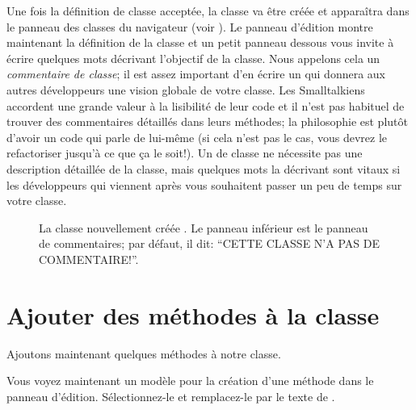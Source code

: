 \documentclass[a4paper,10pt,twoside]{book}
\begin{document}
Une fois la définition de classe acceptée, la classe va \^etre créée et
apparaîtra dans le panneau des classes du navigateur (voir ).
Le panneau d'édition montre maintenant la définition de la classe et
un petit panneau dessous vous invite à écrire quelques mots décrivant
l'objectif de la classe. Nous appelons cela un \emph{commentaire de
  classe}; il est assez important d'en écrire un qui donnera aux
autres développeurs une vision 
globale de votre classe.
Les Smalltalkiens accordent une grande valeur à la lisibilité de leur
code et il n'est pas habituel de trouver des commentaires détaillés
dans leurs méthodes; la philosophie est plutôt d'avoir un code qui
parle de lui-m\^eme (si cela n'est pas le cas, vous devrez le
refactoriser jusqu'à ce que \c{c}a le soit!). 
Un  de classe ne nécessite pas une
description détaillée de la classe, mais quelques mots la décrivant
sont vitaux si les développeurs qui viennent après vous souhaitent
passer un peu de temps sur votre classe.


\begin{figure}[h!t]
\caption{La classe nouvellement créée . Le panneau
  inférieur est le panneau de commentaires; par défaut, il dit:
  ``CETTE CLASSE N'A PAS DE COMMENTAIRE!''.
\label{fig:SBECell}}
\end{figure}

\section{Ajouter des méthodes à la classe}

Ajoutons maintenant quelques méthodes à notre classe.

Vous voyez maintenant un modèle pour la création d'une méthode dans le panneau d'édition.
Sélectionnez-le et remplacez-le par le texte de .
\end{document}
